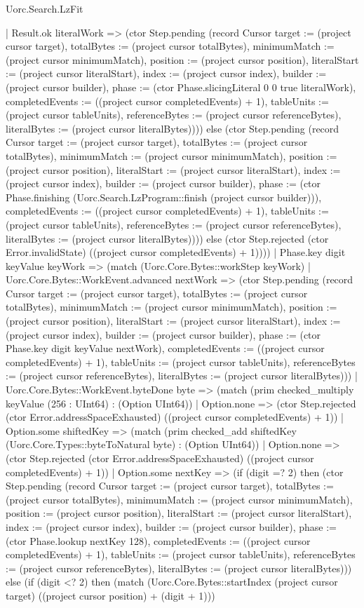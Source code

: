 \begin{lexlean}{Uorc.Search.LzFit}
\begin{semanticmodule}
{      | Result.ok literalWork => (ctor Step.pending (record Cursor {target := (project cursor target), totalBytes := (project cursor totalBytes), minimumMatch := (project cursor minimumMatch), position := (project cursor position), literalStart := (project cursor literalStart), index := (project cursor index), builder := (project cursor builder), phase := (ctor Phase.slicingLiteral 0 0 true literalWork), completedEvents := ((project cursor completedEvents) + 1), tableUnits := (project cursor tableUnits), referenceBytes := (project cursor referenceBytes), literalBytes := (project cursor literalBytes)}))) else (ctor Step.pending (record Cursor {target := (project cursor target), totalBytes := (project cursor totalBytes), minimumMatch := (project cursor minimumMatch), position := (project cursor position), literalStart := (project cursor literalStart), index := (project cursor index), builder := (project cursor builder), phase := (ctor Phase.finishing (Uorc.Search.LzProgram::finish (project cursor builder))), completedEvents := ((project cursor completedEvents) + 1), tableUnits := (project cursor tableUnits), referenceBytes := (project cursor referenceBytes), literalBytes := (project cursor literalBytes)}))) else (ctor Step.rejected (ctor Error.invalidState) ((project cursor completedEvents) + 1))))
    | Phase.key digit keyValue keyWork => (match (Uorc.Core.Bytes::workStep keyWork)
      | Uorc.Core.Bytes::WorkEvent.advanced nextWork => (ctor Step.pending (record Cursor {target := (project cursor target), totalBytes := (project cursor totalBytes), minimumMatch := (project cursor minimumMatch), position := (project cursor position), literalStart := (project cursor literalStart), index := (project cursor index), builder := (project cursor builder), phase := (ctor Phase.key digit keyValue nextWork), completedEvents := ((project cursor completedEvents) + 1), tableUnits := (project cursor tableUnits), referenceBytes := (project cursor referenceBytes), literalBytes := (project cursor literalBytes)}))
      | Uorc.Core.Bytes::WorkEvent.byteDone byte => (match (prim checked_multiply keyValue (256 : UInt64) : (Option UInt64))
        | Option.none => (ctor Step.rejected (ctor Error.addressSpaceExhausted) ((project cursor completedEvents) + 1))
        | Option.some shiftedKey => (match (prim checked_add shiftedKey (Uorc.Core.Types::byteToNatural byte) : (Option UInt64))
          | Option.none => (ctor Step.rejected (ctor Error.addressSpaceExhausted) ((project cursor completedEvents) + 1))
          | Option.some nextKey => (if (digit =? 2) then (ctor Step.pending (record Cursor {target := (project cursor target), totalBytes := (project cursor totalBytes), minimumMatch := (project cursor minimumMatch), position := (project cursor position), literalStart := (project cursor literalStart), index := (project cursor index), builder := (project cursor builder), phase := (ctor Phase.lookup nextKey 128), completedEvents := ((project cursor completedEvents) + 1), tableUnits := (project cursor tableUnits), referenceBytes := (project cursor referenceBytes), literalBytes := (project cursor literalBytes)})) else (if (digit <? 2) then (match (Uorc.Core.Bytes::startIndex (project cursor target) ((project cursor position) + (digit + 1)))
}
\end{semanticmodule}
\end{lexlean}
